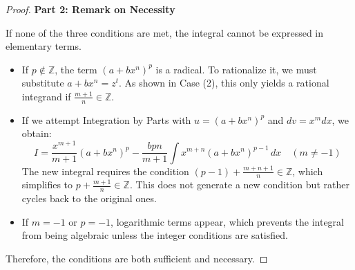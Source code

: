 \begin{proof}
\vspace{1em}
\noindent \textbf{Part 2: Remark on Necessity}

If none of the three conditions are met, the integral cannot be expressed in elementary terms. 
\begin{itemize}
    \item If $p \notin \mathbb{Z}$, the term $(a+bx^n)^p$ is a radical. To rationalize it, we must substitute $a+bx^n = z^t$. As shown in Case (2), this only yields a rational integrand if $\frac{m+1}{n} \in \mathbb{Z}$.
    \item If we attempt Integration by Parts with $u = (a+bx^n)^p$ and $dv = x^m dx$, we obtain:
    \[
    I = \frac{x^{m+1}}{m+1}(a+bx^n)^p - \frac{bpn}{m+1} \int x^{m+n}(a+bx^n)^{p-1} \, dx \quad (m \neq -1)
    \]
    The new integral requires the condition $(p-1) + \frac{m+n+1}{n} \in \mathbb{Z}$, which simplifies to $p + \frac{m+1}{n} \in \mathbb{Z}$. This does not generate a new condition but rather cycles back to the original ones.
    \item If $m = -1$ or $p = -1$, logarithmic terms appear, which prevents the integral from being algebraic unless the integer conditions are satisfied.
\end{itemize}
Therefore, the conditions are both sufficient and necessary.
\end{proof}